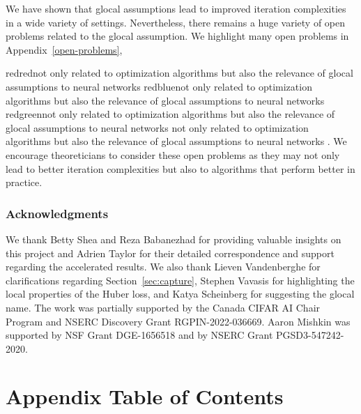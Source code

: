 \documentclass[10pt]{article} %
\newif\ifextended
\newif\ifshowcolours
\def\red{red}
\def\blue{blue}
\def\green{green}
\renewcommand{\textcolor}[2]{%
  \ifshowcolours
    {\color{#1}#2}%
  \else
    \def\temp{#1}%
    \ifx\temp\red     #2\else
    \ifx\temp\blue    #2\else
    \ifx\temp\green   #2\else
        {\color{#1}#2}%
    \fi\fi\fi
  \fi
}
\begin{document}
We have shown that glocal assumptions lead to improved iteration complexities in a wide variety of settings. Nevertheless, there remains a huge variety of open problems related to the glocal assumption. We highlight many open problems in Appendix~\ref{open-problems}, \textcolor{red}{not only related to optimization algorithms but also the relevance of glocal assumptions to neural networks}. We encourage theoreticians to consider these open problems as they may not only lead to better iteration complexities but also to algorithms that perform better in practice.


\subsubsection*{Acknowledgments}
We thank Betty Shea and Reza Babanezhad for providing valuable insights on this project and Adrien Taylor for their detailed correspondence and support regarding the accelerated results. We also thank Lieven Vandenberghe for clarifications regarding Section~\ref{sec:capture}, Stephen Vavasis for highlighting the local properties of the Huber loss, and Katya Scheinberg for suggesting the glocal name. The work was partially supported by the Canada CIFAR AI Chair Program and NSERC Discovery Grant RGPIN-2022-036669. Aaron Mishkin was supported by NSF Grant DGE-1656518 and by NSERC Grant PGSD3-547242-2020.




\appendix
\ifextended
\pagebreak
\section*{Appendix Table of Contents}
\end{document}

